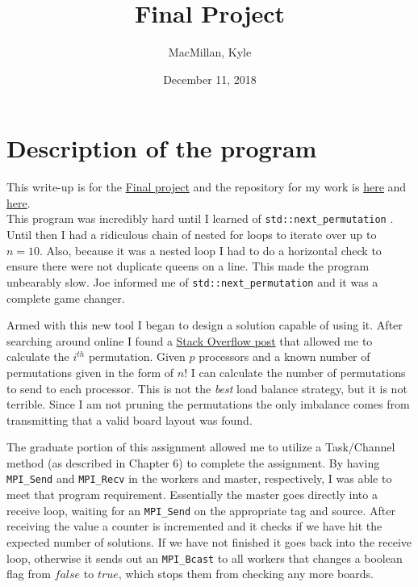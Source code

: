\documentclass{article}
\title{\textbf{Final Project}}
\author{MacMillan, Kyle}
\date{December 11, 2018}
\begin{document}
\maketitle
{}

\newpage
{}   %
\tableofcontents
{}

\newpage
\listoffigures
{}

\newpage
{}  %
\hypersetup{
    colorlinks,
    citecolor=blue,
    filecolor=black,
    linkcolor=blue,
    urlcolor=blue
}

\section{Description of the program}
\setcounter{page}{1} %
This write-up is for the 
\href{https://www.mcs.sdsmt.edu/ckarlsso/csc410/fall18/csc410_Final.pdf}{Final project} 
and the repository for my work is 
\href{https://github.com/macattackftw/HighPerfComputing/tree/master/final}{here} 
and 
\href{https://github.com/macattackftw/HighPerfComputing/tree/master/seqfinal}{here}.
\\

This program was incredibly hard until I learned of \verb|std::next_permutation|
. Until then I had a ridiculous chain of nested for loops to iterate over up to 
$n = 10$. Also, because it was a nested loop I had to do a horizontal check to 
ensure there were not duplicate queens on a line. This made the program 
unbearably slow. Joe informed me of \verb|std::next_permutation| and it was a 
complete game changer. 

Armed with this new tool I began to design a solution capable of using it. After 
searching around online I found a 
\href{https://stackoverflow.com/a/7919887}{Stack Overflow post} that allowed me 
to calculate the $i^{th}$ permutation. Given $p$ processors and a known number 
of permutations given in the form of $n!$ I can calculate the number of 
permutations to send to each processor. This is not the \textit{best} load 
balance strategy, but it is not terrible. Since I am not pruning the 
permutations the only imbalance comes from transmitting that a valid board 
layout was found.

The graduate portion of this assignment allowed me to utilize a Task/Channel 
method (as described in Chapter 6) to complete the assignment. By having 
\verb|MPI_Send| and \verb|MPI_Recv| in the workers and master, respectively, I 
was able to meet that program requirement. Essentially the master goes directly 
into a receive loop, waiting for an \verb|MPI_Send| on the appropriate tag and 
source. After receiving the value a counter is incremented and it checks if we 
have hit the expected number of solutions. If we have not finished it goes back 
into the receive loop, otherwise it sends out an \verb|MPI_Bcast| to all workers 
that changes a boolean flag from $false$ to $true$, which stops them from 
checking any more boards.
\end{document}
